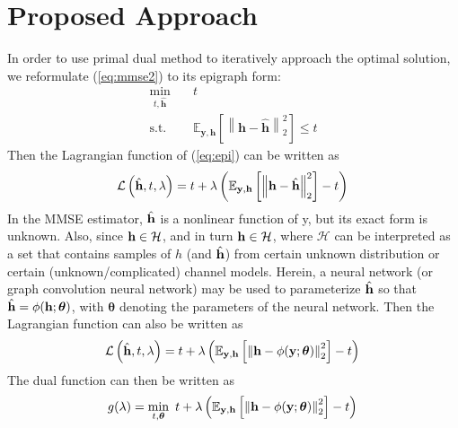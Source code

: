 \documentclass[journal,12pt,onecolumn,draftclsnofoot]{IEEEtran}
\begin{document}
    \section{Proposed Approach}
        In order to use primal dual method to iteratively approach the optimal solution, we reformulate (\ref{eq:mmse2}) to its epigraph form:
        \begin{equation}
        \begin{aligned} \label{eq:epi}
            \min_{t,\hat{\mathbf{h}}} \quad & t \\
            \text{s.t.} \quad & \mathbb{E}_{\mathbf{y},\mathbf{h}}\left[\left\| \mathbf{h}-\hat{\mathbf{h}} \right\|^2_2\right] \leq t
        \end{aligned}
        \end{equation}
        Then the Lagrangian function of (\ref{eq:epi}) can be written as
        \begin{equation} \label{eq:Lag1}
            \mathcal{L} \left(\hat{{\bf h}},t,\lambda\right) = t + \lambda\left(\mathbb{E}_{{\bf y},{\bf h}}\left[\left\| {\bf h}-\hat{{\bf h}} \right\|^2_2 \right] -t \right)\\
        \end{equation}
        In the MMSE estimator, $\hat{{\bf h}}$ is a nonlinear function of y, but its exact form is unknown. Also, since ${\bf h} \in \mathcal{H} $, 
        and in turn ${\bf h} \in \mathcal{H} $, where $\mathcal{H}$ can be interpreted as a set that contains samples of $h$ (and $\hat{{\bf h}}$) from certain 
        unknown distribution or certain (unknown/complicated) channel models. Herein, a neural network (or graph convolution neural network) may be used to
        parameterize $\hat{{\bf h}}$ so that $\hat{{\bf h}}=\phi({\bf h};\boldsymbol{\theta})$, with $\boldsymbol{\theta}$ denoting the parameters of the neural network.
        Then the Lagrangian function can also be written as
        \begin{equation} \label{eq:Lag2}
            \mathcal{L} \left(\hat{{\bf h}},t,\lambda\right) = t + \lambda\left(\mathbb{E}_{{\bf y},{\bf h}}\left[\left\| {\bf h}-\phi(\mathbf{y};\boldsymbol{\theta}) \right\|^2_2 \right] -t \right)\\
        \end{equation}
        The dual function can then be written as
        \begin{equation} \label{eq:dual}
            g(\lambda) = \min_{t,\boldsymbol{\theta}}~ t + \lambda\left(\mathbb{E}_{{\bf y},{\bf h}}\left[\left\| {\bf h}-\phi(\mathbf{y};\boldsymbol{\theta}) \right\|^2_2 \right] -t \right)\\
        \end{equation}
\end{document}
